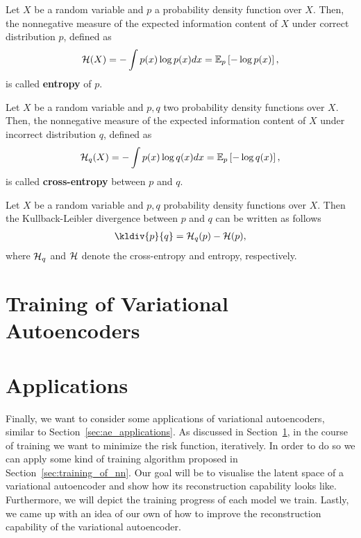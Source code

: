 \begin{definition}\label{def_entropy}
Let $X$ be a random variable and $p$ a probability density function over $X$. Then, the nonnegative measure of the expected information content of $X$ under correct distribution $p$, defined as
\begin{align}
\mathcal{H}(X) = -\int p(x) \log p(x)dx = \operatorname{\mathbb{E}}_p \left[ - \log p(x) \right],
\end{align}
is called \textbf{entropy} of $p$.
\end{definition}


\begin{definition}\label{def_cross_entropy}
Let $X$ be a random variable and $p, q$ two probability density functions over $X$. Then, the nonnegative measure of the expected information content of $X$ under incorrect distribution $q$, defined as
\begin{align}
\mathcal{H}_q(X) = -\int p(x) \log q(x)dx = \operatorname{\mathbb{E}}_p \left[ - \log q(x) \right],
\end{align}
is called \textbf{cross-entropy} between $p$ and $q$.
\end{definition}


\begin{remark}
Let $X$ be a random variable and $p, q$ probability density functions over $X$. Then the Kullback-Leibler divergence between $p$ and $q$ can be written as follows
\begin{align*}
\kldiv{p}{q} = \H_q(p) - \H(p),
\end{align*}
where $\mathcal{H}_q$ and $\mathcal{H}$ denote the cross-entropy and entropy, respectively.
\end{remark}

\section{Training of Variational Autoencoders}\label{sec:train_vae}

\section{Applications}\label{sec:vae_applications}

Finally, we want to consider some applications of variational autoencoders, similar to Section~\ref{sec:ae_applications}. As discussed in Section~\ref{sec:train_vae}, in the course of training we want to minimize the risk function, iteratively. In order to do so we can apply some kind of training algorithm proposed in Section~\ref{sec:training_of_nn}. Our goal will be to visualise the latent space of a variational autoencoder and show how its reconstruction capability looks like. Furthermore, we will depict the training progress of each model we train. Lastly, we came up with an idea of our own of how to improve the reconstruction capability of the variational autoencoder.
